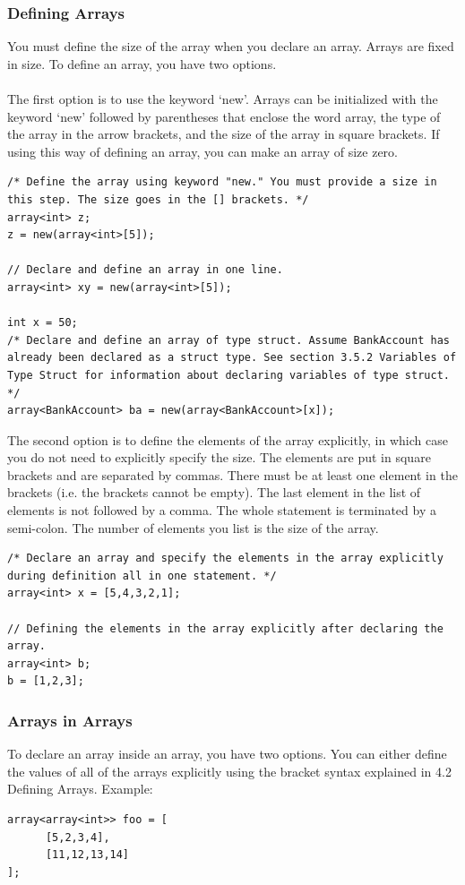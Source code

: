 \documentclass[12pt]{article}
\begin{document}
\subsubsection{Defining Arrays}
You must define the size of the array when you declare an array. Arrays are fixed in size.
To define an array, you have two options.\\
\\
The first option is to use the keyword `new'. Arrays can be initialized with the keyword `new' followed by parentheses that enclose the word array, the type of the array in the arrow brackets, and the size of the array in square brackets. If using this way of defining an array, you can make an array of size zero.\\
\begin{lstlisting}
/* Define the array using keyword "new." You must provide a size in this step. The size goes in the [] brackets. */
array<int> z;
z = new(array<int>[5]); 

// Declare and define an array in one line.
array<int> xy = new(array<int>[5]);

int x = 50;
/* Declare and define an array of type struct. Assume BankAccount has already been declared as a struct type. See section 3.5.2 Variables of Type Struct for information about declaring variables of type struct. */
array<BankAccount> ba = new(array<BankAccount>[x]);
\end{lstlisting}

The second option is to define the elements of the array explicitly, in which case you do not need to explicitly specify the size. The elements are put in square brackets and are separated by commas. There must be at least one element in the brackets (i.e. the brackets cannot be empty). The last element in the list of elements is not followed by a comma. The whole statement is terminated by a semi-colon. The number of elements you list is the size of the array. \\

\begin{lstlisting}
/* Declare an array and specify the elements in the array explicitly during definition all in one statement. */
array<int> x = [5,4,3,2,1];

// Defining the elements in the array explicitly after declaring the array.
array<int> b;
b = [1,2,3];
\end{lstlisting}

\subsubsection{Arrays in Arrays}
To declare an array inside an array, you have two options. You can either define the values of all of the arrays explicitly using the bracket syntax explained in 4.2 Defining Arrays. 
Example:
\begin{lstlisting}
array<array<int>> foo = [
      [5,2,3,4],
      [11,12,13,14]
];

\end{lstlisting}
\end{document}
